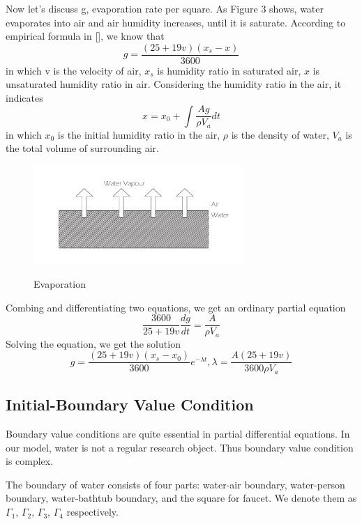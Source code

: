 \documentclass[12pt,a4paper,titlepage]{article}
\begin{document}
Now let's discuss g, evaporation rate per square.
As Figure 3 shows, water evaporates into air and air humidity increases, until it is saturate. According to empirical formula in [], we know that
\begin{equation}
 g=\frac{(25+19v)({x_s}-x)}{3600}
\end{equation}
in which v is the velocity of air, ${x_s}$ is humidity ratio in saturated air, $x$ is unsaturated humidity ratio in air.
Considering the humidity ratio in the air, it indicates
\begin{equation}
 x=x_0+\int \frac{Ag}{\rho V_a}dt
\end{equation}
in which $x_0$ is the initial humidity ratio in the air, $\rho$ is the density of water, $V_a$ is the total volume of surrounding air.
\begin{figure}[htb]
  \centering
  \includegraphics[width=8cm]{3.pdf}\\
  \caption{Evaporation}\label{3_p}
\end{figure}

Combing and differentiating two equations, we get an ordinary partial equation
\begin{equation}
 \frac{3600}{25+19v} \frac{dg}{dt}=\frac{A}{\rho {V_a}}
\end{equation}
Solving the equation, we get the solution
\begin{equation}
 g=\frac{(25+19v)({x_s}-{x_0})}{3600}e^{-\lambda t}, \lambda =\frac{A(25+19v)}{3600\rho {V_a}}
\end{equation}


\subsection{Initial-Boundary Value Condition}
\label{initial-boundary value condition}

Boundary value conditions are quite essential in partial differential equations. In our model, water is not a regular research object.
Thus boundary value condition is complex.

The boundary of water consists of four parts: water-air boundary, water-person boundary, water-bathtub boundary, and the square for faucet. We denote them as
${\Gamma}_1$, ${\Gamma}_2$, ${\Gamma}_3$, ${\Gamma}_4$ respectively.
\end{document}
